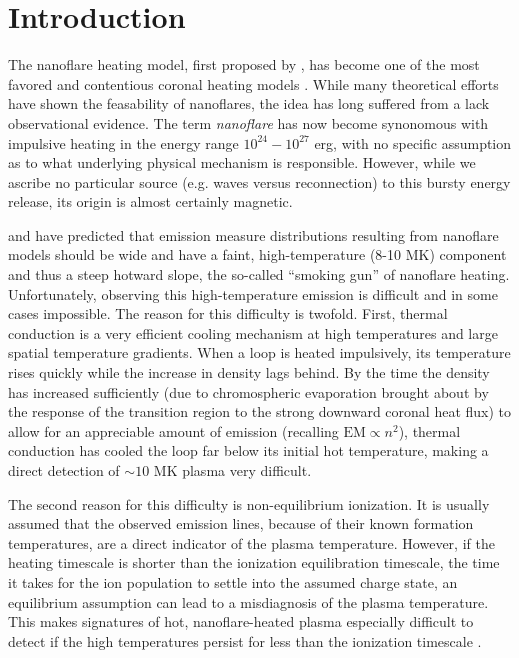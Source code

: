 \documentclass[apj]{emulateapj}
\begin{document}
	\section{Introduction}
	\label{sec:intro}
	\par The nanoflare heating model, first proposed by \citet{parker_nanoflares_1988}, has become one of the most favored and contentious coronal heating models \citep{cargill_implications_1994,cargill_nanoflare_2004,klimchuk_solving_2006}. While many theoretical efforts \citep[e.g.][]{bradshaw_diagnosing_2012,reep_diagnosing_2013,cargill_active_2014} have shown the feasability of nanoflares, the idea has long suffered from a lack observational evidence. The term \textit{nanoflare} has now become synonomous with impulsive heating in the energy range $10^{24}-10^{27}$ erg, with no specific assumption as to what underlying physical mechanism is responsible. However, while we ascribe no particular source (e.g. waves versus reconnection) to this bursty energy release, its origin is almost certainly magnetic.
	\par \citet{cargill_implications_1994} and \citet{cargill_nanoflare_2004} have predicted that emission measure distributions resulting from nanoflare models should be wide and have a faint, high-temperature (8-10 MK) component and thus a steep hotward slope, the so-called ``smoking gun'' of nanoflare heating. Unfortunately, observing this high-temperature emission is difficult and in some cases impossible. The reason for this difficulty is twofold. First, thermal conduction is a very efficient cooling mechanism at high temperatures and large spatial temperature gradients. When a loop is heated impulsively, its temperature rises quickly while the increase in density lags behind. By the time the density has increased sufficiently (due to chromospheric evaporation brought about by the response of the transition region to the strong downward coronal heat flux) to allow for an appreciable amount of emission (recalling $\mathrm{EM}\propto n^2$), thermal conduction has cooled the loop far below its initial hot temperature, making a direct detection of $\sim10$ MK plasma very difficult. 
	\par The second reason for this difficulty is non-equilibrium ionization. It is usually assumed that the observed emission lines, because of their known formation temperatures, are a direct indicator of the plasma temperature. However, if the heating timescale is shorter than the ionization equilibration timescale, the time it takes for the ion population to settle into the assumed charge state, an equilibrium assumption can lead to a misdiagnosis of the plasma temperature. This makes signatures of hot, nanoflare-heated plasma especially difficult to detect if the high temperatures persist for less than the ionization timescale \citep{bradshaw_explosive_2006,bradshaw_what_2011,reale_nonequilibrium_2008}.
\end{document}
